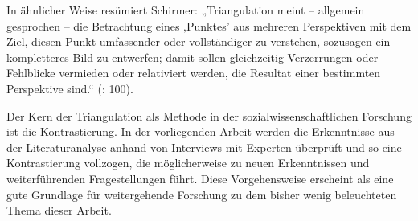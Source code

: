 In ähnlicher Weise resümiert Schirmer: „Triangulation meint – allgemein gesprochen – die Betrachtung eines ‚Punktes’ aus mehreren Perspektiven mit dem Ziel, diesen Punkt umfassender oder vollständiger zu verstehen, sozusagen ein kompletteres Bild zu entwerfen; damit sollen gleichzeitig Verzerrungen oder Fehlblicke vermieden oder relativiert werden, die Resultat einer bestimmten Perspektive sind.“ (\cite{schirmer}: 100). \par
Der Kern der Triangulation als Methode in der sozialwissenschaftlichen Forschung ist die Kontrastierung. In der vorliegenden Arbeit werden die Erkenntnisse aus der Literaturanalyse anhand von Interviews mit Experten überprüft und so eine Kontrastierung vollzogen, die möglicherweise zu neuen Erkenntnissen und weiterführenden Fragestellungen führt. Diese Vorgehensweise erscheint als eine gute Grundlage für weitergehende Forschung zu dem bisher wenig beleuchteten Thema dieser Arbeit.\par

